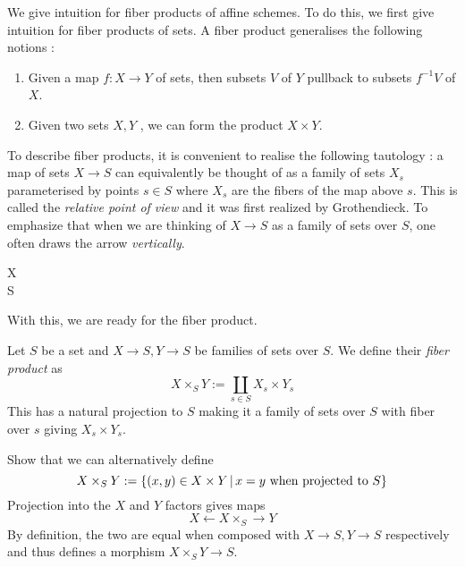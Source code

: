 \documentclass[./main.tex]{subfiles}
\begin{document}
We give intuition for fiber products of affine schemes.
To do this, we first give intuition for fiber products of sets.
A fiber product generalises the following notions : 
\begin{enumerate}
  \item Given a map $f : X \to Y$ of sets,
  then subsets $V$ of $Y$ pullback to subsets $f^{-1}V$ of $X$.
  \item Given two sets $X , Y$ ,
  we can form the product $X \times Y$.
\end{enumerate}
To describe fiber products,
it is convenient to realise the following tautology : 
a map of sets $X \to S$ can equivalently be thought of as
a family of sets $X_s$ parameterised by points $s \in S$
where $X_s$ are the fibers of the map above $s$.
This is called the \emph{relative point of view}
and it was first realized by Grothendieck.
To emphasize that when we are thinking of $X \to S$
as a family of sets over $S$,
one often draws the arrow \emph{vertically}.
\begin{cd}
  X \\
  S 
  \arrow[from = 1-1 , to = 2-1]
\end{cd}
With this, we are ready for the fiber product.
\begin{dfn}
  
  Let $S$ be a set and $X \to S , Y \to S$ be families of sets over $S$.
  We define their \emph{fiber product} as
  \[
    X \times_S Y := \coprod_{s \in S} X_s \times Y_s
  \]
  This has a natural projection to $S$
  making it a family of sets over $S$ with
  fiber over $s$ giving $X_s \times Y_s$.
\end{dfn}

\begin{ex}
  Show that we can alternatively define 
  \[
    X \times_S Y := 
    \left\{ (x , y) \in X \times Y \,|\, x = y \text{ when projected to } S\right\}  
  \]
  Projection into the $X$ and $Y$ factors gives
  maps \[
    X \leftarrow X \times_S \rightarrow Y  
  \]
  By definition, the two are equal when composed with
  $X \to S , Y \to S$ respectively
  and thus defines a morphism $X \times_S Y \to S$.
\end{ex}
\end{document}
